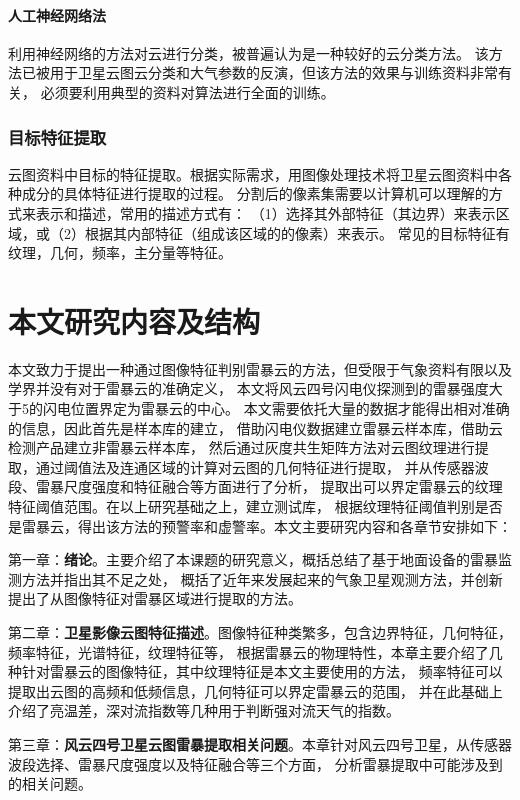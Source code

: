 \paragraph{人工神经网络法}
利用神经网络的方法对云进行分类，被普遍认为是一种较好的云分类方法。
该方法已被用于卫星云图云分类和大气参数的反演，但该方法的效果与训练资料非常有关，
必须要利用典型的资料对算法进行全面的训练。

\subsubsection{目标特征提取}
云图资料中目标的特征提取。根据实际需求，用图像处理技术将卫星云图资料中各种成分的具体特征进行提取的过程。
分割后的像素集需要以计算机可以理解的方式来表示和描述，常用的描述方式有：
（1）选择其外部特征（其边界）来表示区域，或（2）根据其内部特征（组成该区域的的像素）来表示。
常见的目标特征有纹理，几何，频率，主分量等特征。
\fi

\newpage
\section{本文研究内容及结构}
本文致力于提出一种通过图像特征判别雷暴云的方法，但受限于气象资料有限以及学界并没有对于雷暴云的准确定义，
本文将风云四号闪电仪探测到的雷暴强度大于5的闪电位置界定为雷暴云的中心。
本文需要依托大量的数据才能得出相对准确的信息，因此首先是样本库的建立，
借助闪电仪数据建立雷暴云样本库，借助云检测产品建立非雷暴云样本库，
然后通过灰度共生矩阵方法对云图纹理进行提取，通过阈值法及连通区域的计算对云图的几何特征进行提取，
并从传感器波段、雷暴尺度强度和特征融合等方面进行了分析，
提取出可以界定雷暴云的纹理特征阈值范围。在以上研究基础之上，建立测试库，
根据纹理特征阈值判别是否是雷暴云，得出该方法的预警率和虚警率。本文主要研究内容和各章节安排如下：

第一章：\textbf{绪论}。主要介绍了本课题的研究意义，概括总结了基于地面设备的雷暴监测方法并指出其不足之处，
概括了近年来发展起来的气象卫星观测方法，并创新提出了从图像特征对雷暴区域进行提取的方法。

第二章：\textbf{卫星影像云图特征描述}。图像特征种类繁多，包含边界特征，几何特征，频率特征，光谱特征，纹理特征等，
根据雷暴云的物理特性，本章主要介绍了几种针对雷暴云的图像特征，其中纹理特征是本文主要使用的方法，
频率特征可以提取出云图的高频和低频信息，几何特征可以界定雷暴云的范围，
并在此基础上介绍了亮温差，深对流指数等几种用于判断强对流天气的指数。

第三章：\textbf{风云四号卫星云图雷暴提取相关问题}。本章针对风云四号卫星，从传感器波段选择、雷暴尺度强度以及特征融合等三个方面，
分析雷暴提取中可能涉及到的相关问题。

